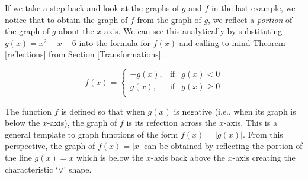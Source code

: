 If we take a step back and look at the graphs of $g$ and $f$ in the last example,  we notice that to obtain the graph of $f$ from the graph of  $g$, we reflect a \textit{portion} of the graph of $g$ about the $x$-axis.  We can see this analytically by substituting $g(x) = x^2-x-6$ into the formula for $f(x)$ and calling to mind Theorem \ref{reflections} from Section \ref{Transformations}.

\setlength{\extrarowheight}{0pt}
\[ f(x) = \left\{ \begin{array}{rcl} -g(x), & \mbox{if} & g(x) < 0  \\ g(x), & \mbox{if} & g(x) \geq 0 \\ \end{array} \right.\]
\setlength{\extrarowheight}{2pt}

The function $f$ is defined so that when $g(x)$ is negative (i.e., when its graph is below the $x$-axis), the graph of $f$ is its refection across the $x$-axis.   This is a general template to graph functions of the form $f(x) = |g(x)|$.  From this perspective, the graph of $f(x) = |x|$ can be obtained by reflecting the portion of the line $g(x) =x$ which is below the $x$-axis back above the $x$-axis creating the characteristic `$\vee$' shape.  

